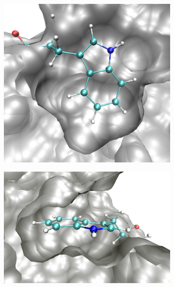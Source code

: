 \begin{figure}[h]
    \centering
    \begin{subfigure}[b]{0.3\textwidth}
        \centering
        \includegraphics[width=\textwidth,height=\textheight,keepaspectratio]{figures/mutation_side_chain_images/in_pocket_out_of_plane.png}
        \caption{}
        \label{figure:mutation_side_chain_images/in_pocket_out_of_plane}
    \end{subfigure}
    \hspace{0.1\textwidth}
    \begin{subfigure}[b]{0.3\textwidth}
        \centering
        \includegraphics[width=\textwidth,height=\textheight,keepaspectratio]{figures/mutation_side_chain_images/in_pocket_in_plane.png}

\end{subfigure}
\end{figure}
